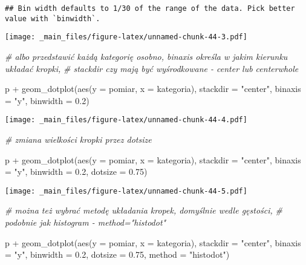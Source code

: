 \documentclass[
]{book}
\newenvironment{Shaded}{\begin{snugshade}}{\end{snugshade}}
\newcommand{\AttributeTok}[1]{\textcolor[rgb]{0.77,0.63,0.00}{#1}}
\newcommand{\CommentTok}[1]{\textcolor[rgb]{0.56,0.35,0.01}{\textit{#1}}}
\newcommand{\FloatTok}[1]{\textcolor[rgb]{0.00,0.00,0.81}{#1}}
\newcommand{\FunctionTok}[1]{\textcolor[rgb]{0.00,0.00,0.00}{#1}}
\newcommand{\NormalTok}[1]{#1}
\newcommand{\SpecialCharTok}[1]{\textcolor[rgb]{0.00,0.00,0.00}{#1}}
\newcommand{\StringTok}[1]{\textcolor[rgb]{0.31,0.60,0.02}{#1}}
\begin{document}
\begin{verbatim}
## Bin width defaults to 1/30 of the range of the data. Pick better value with `binwidth`.
\end{verbatim}

\texttt{[image: \_main\_files/figure-latex/unnamed-chunk-44-3.pdf]}

\begin{Shaded}
\begin{Highlighting}[]
\CommentTok{\# albo przedstawić każdą kategorię osobno, binaxis określa w jakim kierunku układać kropki,}
\CommentTok{\# stackdir czy mają być wyśrodkowane {-} center lub centerwhole}

\NormalTok{p }\SpecialCharTok{+} \FunctionTok{geom\_dotplot}\NormalTok{(}\FunctionTok{aes}\NormalTok{(}\AttributeTok{y =}\NormalTok{ pomiar, }\AttributeTok{x =}\NormalTok{ kategoria), }\AttributeTok{stackdir =} \StringTok{"center"}\NormalTok{, }\AttributeTok{binaxis =} \StringTok{"y"}\NormalTok{, }\AttributeTok{binwidth =} \FloatTok{0.2}\NormalTok{)}
\end{Highlighting}
\end{Shaded}

\texttt{[image: \_main\_files/figure-latex/unnamed-chunk-44-4.pdf]}

\begin{Shaded}
\begin{Highlighting}[]
\CommentTok{\# zmiana wielkości kropki przez dotsize}

\NormalTok{p }\SpecialCharTok{+} \FunctionTok{geom\_dotplot}\NormalTok{(}\FunctionTok{aes}\NormalTok{(}\AttributeTok{y =}\NormalTok{ pomiar, }\AttributeTok{x =}\NormalTok{ kategoria), }\AttributeTok{stackdir =} \StringTok{"center"}\NormalTok{, }\AttributeTok{binaxis =} \StringTok{"y"}\NormalTok{, }
                 \AttributeTok{binwidth =} \FloatTok{0.2}\NormalTok{, }\AttributeTok{dotsize =} \FloatTok{0.75}\NormalTok{)}
\end{Highlighting}
\end{Shaded}

\texttt{[image: \_main\_files/figure-latex/unnamed-chunk-44-5.pdf]}

\begin{Shaded}
\begin{Highlighting}[]
\CommentTok{\# można też wybrać metodę układania kropek, domyślnie wedle gęstości, }
\CommentTok{\# podobnie jak histogram {-} method="histodot"}

\NormalTok{p }\SpecialCharTok{+} \FunctionTok{geom\_dotplot}\NormalTok{(}\FunctionTok{aes}\NormalTok{(}\AttributeTok{y =}\NormalTok{ pomiar, }\AttributeTok{x =}\NormalTok{ kategoria), }\AttributeTok{stackdir =} \StringTok{"center"}\NormalTok{, }\AttributeTok{binaxis =} \StringTok{"y"}\NormalTok{, }
                 \AttributeTok{binwidth =} \FloatTok{0.2}\NormalTok{, }\AttributeTok{dotsize =} \FloatTok{0.75}\NormalTok{, }\AttributeTok{method =} \StringTok{"histodot"}\NormalTok{)}
\end{Highlighting}
\end{Shaded}
\end{document}
